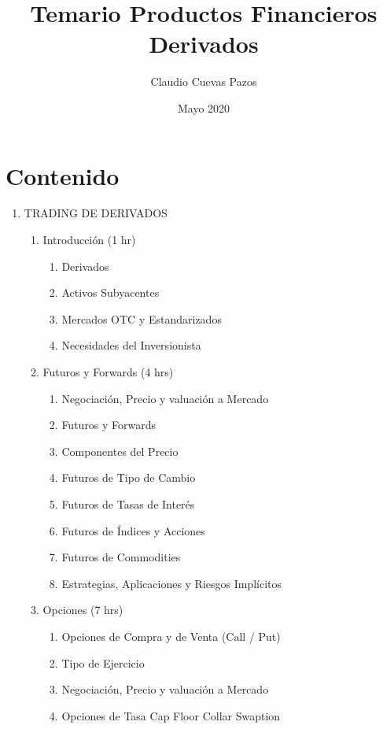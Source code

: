 \documentclass{article}
\title{Temario Productos Financieros Derivados}
\author{Claudio Cuevas Pazos}
\date{Mayo 2020}
\begin{document}
\maketitle

\section{Contenido}

\begin{enumerate}
    \item TRADING DE DERIVADOS
    \begin{enumerate}
        \item Introducción (1 hr)
    \begin{enumerate}
        \item Derivados
        \item Activos Subyacentes
        \item Mercados OTC y Estandarizados
        \item Necesidades del Inversionista
    \end{enumerate}
        \item Futuros y Forwards (4 hrs) 
        \begin{enumerate}
            \item Negociación, Precio y valuación a Mercado
            \item Futuros y Forwards
            \item Componentes del Precio   
            \item Futuros de Tipo de Cambio
            \item Futuros de Tasas de Interés
            \item Futuros de Índices y Acciones
            \item Futuros de Commodities 
            \item Estrategias, Aplicaciones y Riesgos Implícitos
    \end{enumerate}
        \item Opciones (7 hrs)
        \begin{enumerate}
        \item Opciones de Compra y de Venta (Call / Put)
        \item Tipo de Ejercicio
        \item Negociación, Precio y valuación a Mercado
        \item Opciones de Tasa
            \subitem Cap   
            \subitem Floor
            \subitem Collar
            \subitem Swaption

\end{enumerate}
\end{enumerate}
\end{enumerate}
\end{document}
